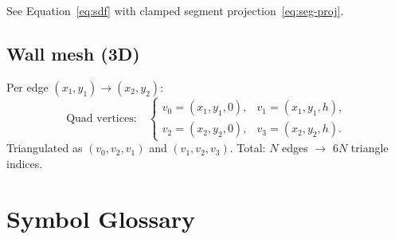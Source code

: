 \documentclass[a4paper, 11pt]{article}
\begin{document}
See Equation~\eqref{eq:sdf} with clamped segment projection~\eqref{eq:seg-proj}.

\subsection{Wall mesh (3D)}

Per edge $(x_1, y_1) \to (x_2, y_2)$:
\begin{equation}
  \text{Quad vertices:}\quad
  \begin{cases}
    v_0 = (x_1, y_1, 0), & v_1 = (x_1, y_1, h), \\
    v_2 = (x_2, y_2, 0), & v_3 = (x_2, y_2, h).
  \end{cases}
\end{equation}
Triangulated as $(v_0, v_2, v_1)$ and $(v_1, v_2, v_3)$.
Total: $N$ edges $\to$ $6N$ triangle indices.

\section{Symbol Glossary}\label{sec:glossary}
\end{document}
